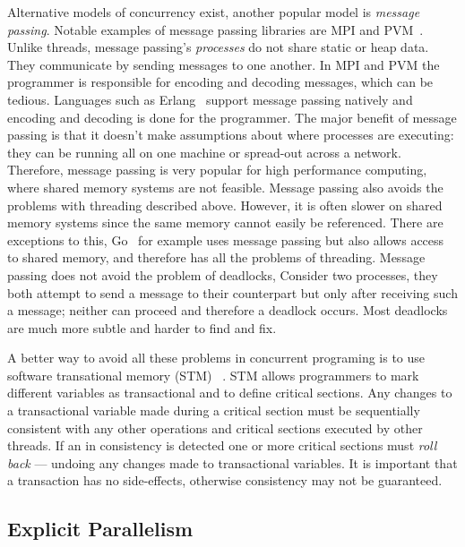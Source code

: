 Alternative models of concurrency exist,
another popular model is \emph{message passing}.
Notable examples of message passing libraries are MPI\citep{mpi} and
PVM~\citep{pvm}.
Unlike threads, message passing's \emph{processes} do not share static or heap data.
They communicate by sending messages to one another.
In MPI and PVM the programmer is responsible for encoding and decoding messages,
which can be tedious.
Languages such as Erlang~\citep{erlang} support message passing natively and
encoding and decoding is done for the programmer.
The major benefit of message passing is that it doesn't make assumptions about where processes
are executing:
they can be running all on one machine or spread-out across a network.
Therefore, message passing is very popular for high performance computing,
where shared memory systems are not feasible.
Message passing also avoids the problems with threading described above.
However,
it is often slower on shared memory systems since the same memory cannot easily
be referenced.
There are exceptions to this,
Go~\citep{balbaert:2012:go} for example uses message passing but also allows
access to shared memory,
and therefore has all the problems of threading.
Message passing does not avoid the problem of deadlocks,
Consider two processes,
they both attempt to send a message to their counterpart but only after
receiving such a message;
neither can proceed and therefore a deadlock occurs.
Most deadlocks are much more subtle and harder to find and fix.

A better way to avoid all these problems in concurrent programing is to use
software transational memory (STM)~%
\citep{harris:2005:haskell-stm,mika:mercury-stm}.
STM allows programmers to mark different variables as transactional
and to define critical sections.
Any changes to a transactional variable made during a critical section must
be sequentially consistent with any other operations and critical
sections executed by other threads.
If an in consistency is detected one or more critical sections must
\emph{roll back} --- undoing any changes made to transactional
variables.
It is important that a transaction has no side-effects, otherwise
consistency may not be guaranteed.


\subsection{Explicit Parallelism}
\label{sec:back_par_explicit}

